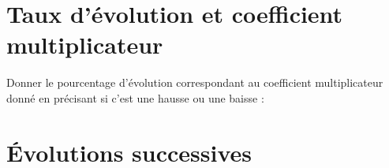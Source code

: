 
\section{Taux d'évolution et coefficient multiplicateur}

\begin{questions}
	
	\question[3] Donner le pourcentage d'évolution correspondant au coefficient multiplicateur donné en précisant si c'est une hausse ou une baisse :
	
\end{questions}


\section{\'Evolutions successives}

